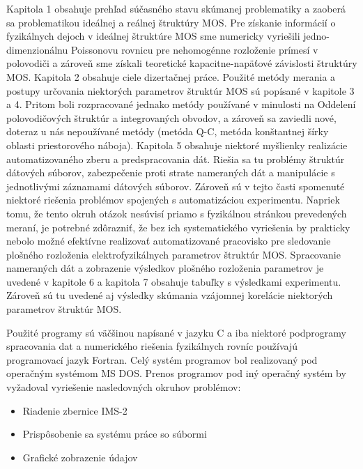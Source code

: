 \par Kapitola 1 obsahuje prehľad súčasného stavu skúmanej problematiky
a zaoberá sa problematikou ideálnej a reálnej štruktúry MOS\@. Pre
získanie informácií o fyzikálnych dejoch v ideálnej štruktúre MOS sme
numericky vyriešili jedno-dimenzionálnu Poissonovu rovnicu pre
nehomogénne rozloženie prímesí v polovodiči a zároveň sme získali
teoretické kapacitne-napäťové závislosti štruktúry MOS\@. Kapitola 2
obsahuje ciele dizertačnej práce. Použité metódy merania a postupy
určovania niektorých parametrov štruktúr MOS sú popísané v kapitole 3
a 4. Pritom boli rozpracované jednako metódy používané v minulosti na
Oddelení polovodičových štruktúr a integrovaných obvodov, a zároveň sa
zaviedli nové, doteraz u nás nepoužívané metódy (metóda Q-C, metóda
konštantnej šírky oblasti priestorového náboja). Kapitola 5 obsahuje
niektoré myšlienky realizácie automatizovaného zberu a predspracovania
dát. Riešia sa tu problémy štruktúr dátových súborov, zabezpečenie
proti strate nameraných dát a manipulácie s jednotlivými záznamami
dátových súborov. Zároveň sú v tejto časti spomenuté niektoré riešenia
problémov spojených s automatizáciou experimentu. Napriek tomu, že
tento okruh otázok nesúvisí priamo s fyzikálnou stránkou prevedených
meraní, je potrebné zdôrazniť, že bez ich systematického vyriešenia by
prakticky nebolo možné efektívne realizovať automatizované pracovisko
pre sledovanie plošného rozloženia elektrofyzikálnych parametrov
štruktúr MOS\@. Spracovanie nameraných dát a zobrazenie výsledkov
plošného rozloženia parametrov je uvedené v kapitole 6 a kapitola 7
obsahuje tabuľky s výsledkami experimentu. Zároveň sú tu uvedené aj
výsledky skúmania vzájomnej korelácie niektorých parametrov štruktúr
MOS\@.

\par Použité programy sú väčšinou napísané v jazyku C a iba niektoré
podprogramy spracovania dat a numerického riešenia fyzikálnych rovníc
používajú programovací jazyk Fortran. Celý systém programov bol
realizovaný pod operačným systémom MS DOS\@. Prenos programov pod iný
operačný systém by vyžadoval vyriešenie nasledovných okruhov
problémov:

\begin{itemize}
\item Riadenie zbernice IMS-2
\item Prispôsobenie sa systému práce so súbormi
\item Grafické zobrazenie údajov
\end{itemize}

